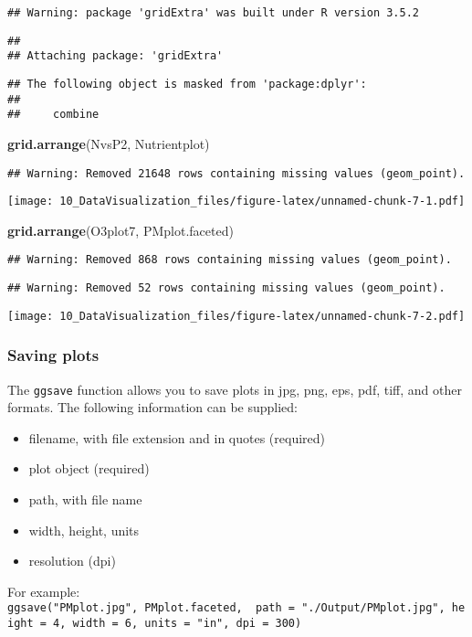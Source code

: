 \documentclass[]{article}
\newenvironment{Shaded}{\begin{snugshade}}{\end{snugshade}}
\newcommand{\KeywordTok}[1]{\textcolor[rgb]{0.13,0.29,0.53}{\textbf{#1}}}
\newcommand{\NormalTok}[1]{#1}
\providecommand{\tightlist}{%
  \setlength{\itemsep}{0pt}\setlength{\parskip}{0pt}}
\begin{document}
\begin{verbatim}
## Warning: package 'gridExtra' was built under R version 3.5.2
\end{verbatim}

\begin{verbatim}
## 
## Attaching package: 'gridExtra'
\end{verbatim}

\begin{verbatim}
## The following object is masked from 'package:dplyr':
## 
##     combine
\end{verbatim}

\begin{Shaded}
\begin{Highlighting}[]
\KeywordTok{grid.arrange}\NormalTok{(NvsP2, Nutrientplot)}
\end{Highlighting}
\end{Shaded}

\begin{verbatim}
## Warning: Removed 21648 rows containing missing values (geom_point).
\end{verbatim}

\texttt{[image: 10\_DataVisualization\_files/figure-latex/unnamed-chunk-7-1.pdf]}

\begin{Shaded}
\begin{Highlighting}[]
\KeywordTok{grid.arrange}\NormalTok{(O3plot7, PMplot.faceted)}
\end{Highlighting}
\end{Shaded}

\begin{verbatim}
## Warning: Removed 868 rows containing missing values (geom_point).
\end{verbatim}

\begin{verbatim}
## Warning: Removed 52 rows containing missing values (geom_point).
\end{verbatim}

\texttt{[image: 10\_DataVisualization\_files/figure-latex/unnamed-chunk-7-2.pdf]}

\subsubsection{Saving plots}\label{saving-plots}

The \texttt{ggsave} function allows you to save plots in jpg, png, eps,
pdf, tiff, and other formats. The following information can be supplied:

\begin{itemize}
\tightlist
\item
  filename, with file extension and in quotes (required)
\item
  plot object (required)
\item
  path, with file name
\item
  width, height, units
\item
  resolution (dpi)
\end{itemize}

For example:
\texttt{ggsave("PMplot.jpg",\ PMplot.faceted,\ \ path\ =\ "./Output/PMplot.jpg",\ height\ =\ 4,\ width\ =\ 6,\ units\ =\ "in",\ dpi\ =\ 300)}
\end{document}
